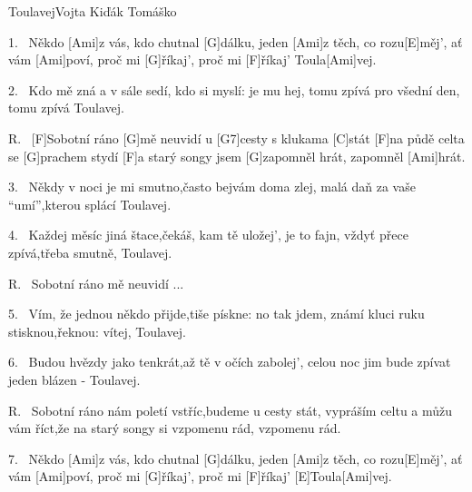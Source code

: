 \begin{song}{Toulavej}{Vojta Kiďák Tomáško}

\begin{xverse}{1.~}
Někdo [\large Ami]z vás, kdo chutnal [\large G]dálku, jeden [\large Ami]z těch, co rozu[\large E]měj',
ať vám [\large Ami]poví, proč mi [\large G]{ří}kaj', proč mi [\large F]{ří}kaj' Toula[\large Ami]vej.
\end{xverse}


\begin{xverse}{2.~}
Kdo mě zná a v sále sedí, kdo si myslí: je mu hej,
tomu zpívá pro všední den, tomu zpívá Toulavej.
\end{xverse}


\begin{xverse}{R.~}
[\large F]Sobotní ráno [\large G]mě neuvidí u [\large G7]cesty s klukama [\large C]stát
[\large F]na půdě celta se [\large G]prachem stydí [\large F]a starý songy jsem [\large G]zapomněl hrát,
zapomněl [\large Ami]hrát.
\end{xverse}


\begin{xverse}{3.~}
Někdy v noci je mi smutno,často bejvám doma zlej,
malá daň za vaše ``umí'',kterou splácí Toulavej.
\end{xverse}


\begin{xverse}{4.~}
Každej měsíc jiná štace,čekáš, kam tě uložej',
je to fajn, vždyť přece zpívá,třeba smutně, Toulavej.
\end{xverse}

\begin{xverse}{R.~}
Sobotní ráno mě neuvidí ...
\end{xverse}

\begin{xverse}{5.~}
Vím, že jednou někdo přijde,tiše pískne: no tak jdem,
známí kluci ruku stisknou,řeknou: vítej, Toulavej.
\end{xverse}


\begin{xverse}{6.~}
Budou hvězdy jako tenkrát,až tě v očích zabolej',
celou noc jim bude zpívat jeden blázen - Toulavej.
\end{xverse}


\begin{xverse}{R.~}
Sobotní ráno nám poletí vstříc,budeme u cesty stát,
vypráším celtu a můžu vám říct,že na starý songy si vzpomenu rád,
vzpomenu rád.
\end{xverse}

\begin{xverse}{7.~}
Někdo [\large Ami]z vás, kdo chutnal [\large G]dálku, jeden [\large Ami]z těch, co rozu[\large E]měj',
ať vám [\large Ami]poví, proč mi [\large G]{ří}kaj', proč mi [\large F]{ří}kaj' [\large E]Toula[\large Ami]vej.
\end{xverse}
\end{song}

